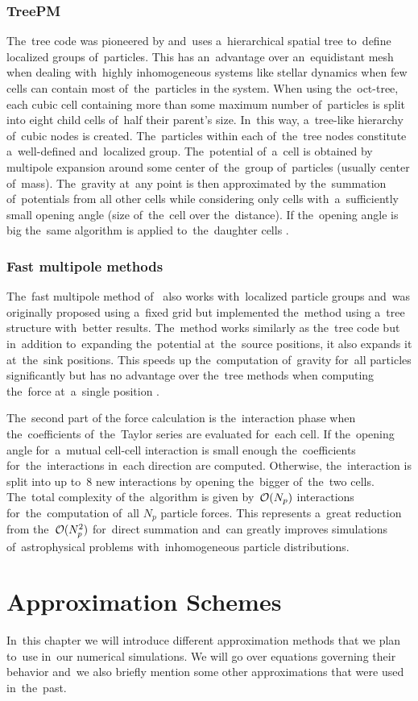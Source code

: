 \subsection{TreePM}
The~tree code was pioneered by \textcite{1986Natur.324..446B} and~uses a~hierarchical spatial tree to~define localized groups of~particles. This has an~advantage over an~equidistant mesh when dealing with~highly inhomogeneous systems like stellar dynamics when few cells can contain most of~the~particles in the system. When using the~oct-tree, each cubic cell containing more than some maximum number of~particles is split into eight child cells of~half their parent's size. In~this way, a~tree-like hierarchy of~cubic nodes is created. The~particles within each of~the~tree nodes constitute a~well-defined and~localized group. The~potential of~a~cell is obtained by multipole expansion around some center of~the~group of~particles (usually center of~mass). The~gravity at~any point is then approximated by the~summation of~potentials from all other cells while considering only cells with~a~sufficiently small opening angle (size of~the~cell over the~distance). If the~opening angle is big the~same algorithm is applied to~the~daughter cells \parencite{2011EPJP..126...55D}.
\subsection{Fast multipole methods}
The~fast multipole method of~\textcite{1987JCoPh..73..325G} also works with~localized particle groups and~was originally proposed using a~fixed grid but \textcite{2000ApJ...536L..39D} implemented the~method using a~tree structure with~better results. The~method works similarly as the~tree code but in~addition to~expanding the~potential at~the~source positions, it also expands it at~the~sink positions. This speeds up the~computation of~gravity for~all particles significantly but has no advantage over the~tree methods when computing the~force at~a~single position \parencite{2011EPJP..126...55D}.

The~second part of the force calculation is the~interaction phase when the~coefficients of~the~Taylor series are evaluated for~each cell. If the~opening angle for~a~mutual cell-cell interaction is small enough the~coefficients for~the~interactions in~each direction are computed.  Otherwise, the~interaction is split into up to~8 new interactions by opening the~bigger of~the~two cells. The~total complexity of the~algorithm is given by~$\mathcal{O}(N_p)$ interactions for~the~computation of~all $N_p$ particle forces. This represents a~great reduction from the~$\mathcal{O}(N_p^2)$ for~direct summation and~can greatly improves simulations of~astrophysical problems with~inhomogeneous particle distributions.
%
\clearpage{}
\clearpage{}\chapter{Approximation Schemes}
\label{chpt:app_schemes}
In~this chapter we will introduce different approximation methods that we plan to~use in~our numerical simulations. We will go over equations governing their behavior and~we also briefly mention some other approximations that were used in~the~past.

